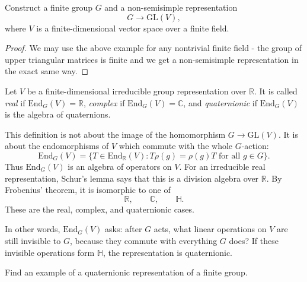 \begin{exercise}
\label{exercise-finite-field-nonsemisimple}
Construct a finite group $G$ and a
non-semisimple representation
$$
G \longrightarrow \text{GL}(V),
$$
where $V$ is a finite-dimensional vector
space over a finite field.
\end{exercise}

\begin{proof}
We may use the above example for any
nontrivial finite field - the group
of upper triangular matrices is finite
and we get a non-semisimple representation
in the exact same way.
\end{proof}

\begin{definition}
\label{definition-real-complex-quaternionic}
Let $V$ be a finite-dimensional irreducible
group representation over $\mathbb{R}$.
It is called {\it real} if
$\text{End}_G(V)=\mathbb{R}$, {\it complex}
if $\text{End}_G(V)=\mathbb{C}$, and
{\it quaternionic} if $\text{End}_G(V)$ is
the algebra of quaternions.
\end{definition}

\begin{remark}
\label{remark-real-complex-quaternionic}
This definition is not about the image of
the homomorphism
$G \to \text{GL}(V)$. It is about the
endomorphisms of $V$ which commute with the
whole $G$-action:
$$
\text{End}_G(V)=
\{T\in \text{End}_{\mathbb{R}}(V):
T\rho(g)=\rho(g)T\text{ for all }g\in G\}.
$$
Thus $\text{End}_G(V)$ is an algebra of
operators on $V$. For an irreducible real
representation, Schur's lemma says that this
is a division algebra over $\mathbb{R}$.
By Frobenius' theorem, it is isomorphic to
one of
$$
\mathbb{R},\qquad \mathbb{C},\qquad
\mathbb{H}.
$$
These are the real, complex, and
quaternionic cases.

In other words, $\text{End}_G(V)$ asks:
after $G$ acts, what linear operations on
$V$ are still invisible to $G$, because they
commute with everything $G$ does? If these
invisible operations form $\mathbb{H}$, the
representation is quaternionic.
\end{remark}

\begin{exercise}
\label{exercise-quaternionic-finite-group}
Find an example of a quaternionic
representation of a finite group.
\end{exercise}

